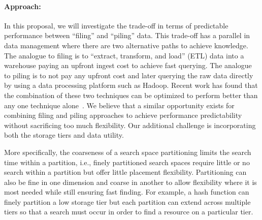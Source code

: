 \paragraph{Approach:} 
In this proposal, we will investigate the trade-off in terms of predictable
performance between ``filing'' and ``piling'' data.  This trade-off has a
parallel in data management where there are two alternative paths to achieve
knowledge. The analogue to filing is  to ``extract, transform, and load'' (ETL)
data into a warehouse paying an upfront ingest cost to achieve fast querying.
The analogue to piling is to not pay any upfront cost and later querying the
raw data directly by using a data processing platform such as Hadoop.  Recent
work has found that the combination of these two techniques can be optimized to
perform better than any one technique alone~\cite{lefevre:sigmod14a}. We
believe that a similar opportunity exists for combining filing and piling
approaches to achieve performance predictability without sacrificing too much
flexibility. Our additional challenge is incorporating both the storage tiers
and data utility.

More specifically, the coarseness of a search space partitioning limits the
search time within a partition, i.e., finely partitioned search spaces require
little or no search within a partition but offer little placement flexibility.
Partitioning can also be fine in one dimension and coarse in another to allow
flexibility where it is most needed while still ensuring fast finding. For
example, a hash function can finely partition a low storage tier but each
partition can extend across multiple tiers so that a search must occur in order
to find a resource on a particular tier.  


